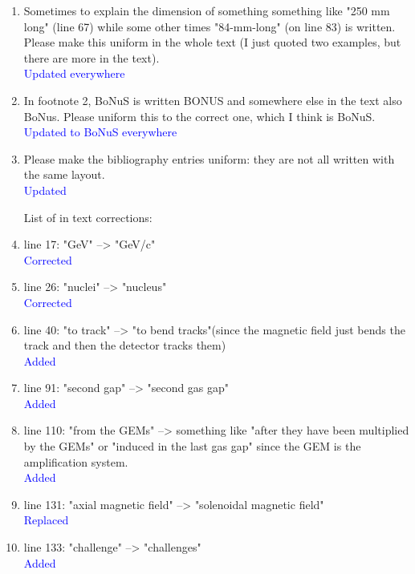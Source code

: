 \documentclass[a4paper,11pt,twoside]{article}
\begin{document}
\begin{enumerate}
\item Sometimes to explain the dimension of something something like "250 mm 
   long" (line 67) while some other times "84-mm-long" (on line 83) is written. 
   Please make this uniform in the whole text (I just quoted two examples, but 
   there are more in the text).\\
\textcolor{blue}{Updated everywhere} 

\item In footnote 2, BoNuS is written BONUS and somewhere else in the text also 
   BoNus. Please uniform this to the correct one, which I think is BoNuS.\\
\textcolor{blue}{Updated to BoNuS everywhere} 

\item Please make the bibliography entries uniform: they are not all written 
   with the same layout.\\
\textcolor{blue}{Updated} 

List of in text corrections:

\item line 17: "GeV" --> "GeV/c"\\
\textcolor{blue}{Corrected} 

\item line 26: "nuclei" --> "nucleus"\\
\textcolor{blue}{Corrected} 

\item line 40: "to track" --> "to bend tracks"(since the magnetic field just 
   bends the track and then the detector tracks them)\\
\textcolor{blue}{Added} 

\item line 91: "second gap" --> "second gas gap"\\
\textcolor{blue}{Added} 

\item line 110: "from the GEMs" -->  something like "after they have been 
   multiplied by the GEMs" or "induced in the last gas gap" since the GEM is 
   the amplification system.\\
\textcolor{blue}{Added} 

\item line 131: "axial magnetic field" --> "solenoidal magnetic field"\\
\textcolor{blue}{Replaced} 

\item line 133: "challenge" --> "challenges"\\
\textcolor{blue}{Added} 


\end{enumerate}
\end{document}
